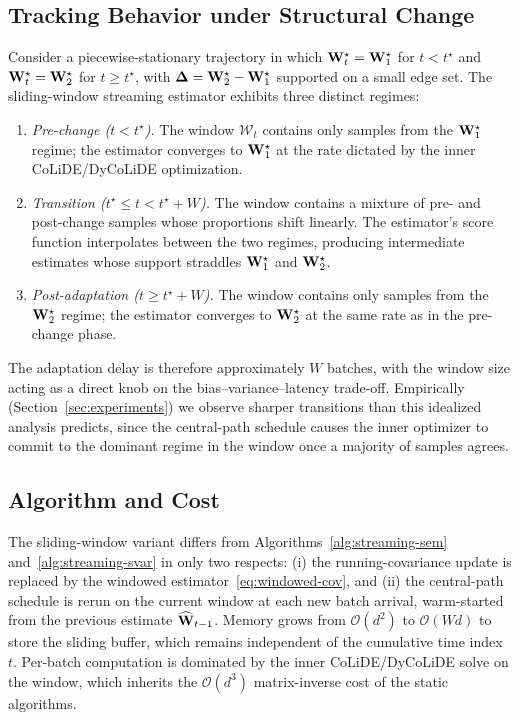 \documentclass[journal,twoside]{IEEEtran}
\begin{document}
\subsection{Tracking Behavior under Structural Change}
\label{sec:tracking}
Consider a piecewise-stationary trajectory in which
${\mathbf W}^\star_t = {\mathbf W}_1^\star$ for $t < t^\star$ and
${\mathbf W}^\star_t = {\mathbf W}_2^\star$ for $t \geq t^\star$, with
$\boldsymbol{\Delta} = {\mathbf W}_2^\star - {\mathbf W}_1^\star$ supported on a small
edge set. The sliding-window streaming estimator exhibits three
distinct regimes:
\begin{enumerate}
\item \emph{Pre-change ($t < t^\star$).} The window
$\mathcal{W}_t$ contains only samples from the ${\mathbf W}_1^\star$
regime; the estimator converges to ${\mathbf W}_1^\star$ at the rate
dictated by the inner CoLiDE/DyCoLiDE optimization.

\item \emph{Transition ($t^\star \leq t < t^\star + W$).} The window
contains a mixture of pre- and post-change samples whose proportions
shift linearly. The estimator's score function interpolates between
the two regimes, producing intermediate estimates whose support
straddles ${\mathbf W}_1^\star$ and ${\mathbf W}_2^\star$.

\item \emph{Post-adaptation ($t \geq t^\star + W$).} The window
contains only samples from the ${\mathbf W}_2^\star$ regime; the
estimator converges to ${\mathbf W}_2^\star$ at the same rate as in the
pre-change phase.
\end{enumerate}
The adaptation delay is therefore approximately $W$ batches, with the
window size acting as a direct knob on the bias--variance--latency
trade-off. Empirically (Section~\ref{sec:experiments}) we observe
sharper transitions than this idealized analysis predicts, since the
central-path schedule causes the inner optimizer to commit to
the dominant regime in the window once a majority of samples agrees.

\subsection{Algorithm and Cost}
\label{sec:adaptation-algo}
The sliding-window variant differs from
Algorithms~\ref{alg:streaming-sem} and~\ref{alg:streaming-svar} in only
two respects: (i) the running-covariance update is replaced by the
windowed estimator~\eqref{eq:windowed-cov}, and (ii) the central-path
schedule is rerun on the current window at each new batch arrival,
warm-started from the previous estimate $\widehat{{\mathbf W}}_{t-1}$.
Memory grows from $\mathcal{O}(d^2)$ to $\mathcal{O}(W d)$ to store the
sliding buffer, which remains independent of the cumulative time index
$t$. Per-batch computation is dominated by the inner CoLiDE/DyCoLiDE
solve on the window, which inherits the $\mathcal{O}(d^3)$ matrix-inverse
cost of the static algorithms.
\end{document}
